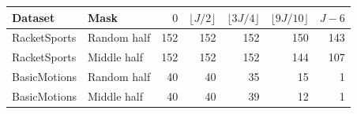 \begin{tabular}{llrrrrr}\toprule
Dataset & Mask & $0$ & $\lfloor J/2\rfloor$ & $\lfloor3J/4\rfloor$ & $\lfloor9J/10\rfloor$ & $J-6$ \\\midrule
RacketSports & Random half & 152 & 152 & 152 & 150 & 143 \\
RacketSports & Middle half & 152 & 152 & 152 & 144 & 107 \\
BasicMotions & Random half & 40 & 40 & 35 & 15 & 1 \\
BasicMotions & Middle half & 40 & 40 & 39 & 12 & 1 \\
\bottomrule\end{tabular}
